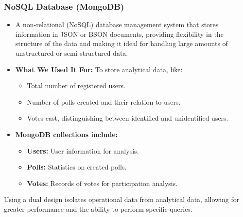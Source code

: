 \subsubsection{NoSQL Database (MongoDB)}

\begin{itemize}
    \item A non-relational (NoSQL) database management system that stores information in JSON or BSON documents, providing flexibility in the structure of the data and making it ideal for handling large amounts of unstructured or semi-structured data.
    \item \textbf{What We Used It For:} To store analytical data, like:
    \begin{itemize}
        \item Total number of registered users.
        \item Number of polls created and their relation to users.
        \item Votes cast, distinguishing between identified and unidentified users.
    \end{itemize}
    \item \textbf{MongoDB collections include:}
    \begin{itemize}
        \item \textbf{Users:} User information for analysis.
        \item \textbf{Polls:} Statistics on created polls.
        \item \textbf{Votes:} Records of votes for participation analysis.
    \end{itemize}
\end{itemize}

Using a dual design isolates operational data from analytical data, allowing for greater performance and the ability to perform specific queries.

\newpage 

